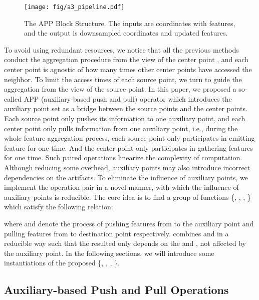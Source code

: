 \documentclass[journal]{IEEEtran}
\begin{document}
\begin{figure*}[tbp]
\begin{center}
\texttt{[image: fig/a3\_pipeline.pdf]}
\end{center}
   \caption{The APP Block Structure. The inputs are coordinates with features, and the output is downsampled coordinates and updated features.}
\end{figure*}


To avoid using redundant resources, we notice that all the previous methods conduct the aggregation procedure from the view of the center point , and each center point is agnostic of how many times other center points have accessed the neighbor. To limit the access times of each source point, we turn to guide the aggregation from the view of the source point. In this paper, we proposed a so-called APP (\textcolor[rgb]{1,0,0}{a}uxiliary-based \textcolor[rgb]{1,0,0}{p}ush and \textcolor[rgb]{1,0,0}{p}ull) operator which introduces the auxiliary point set  as a bridge between the source points and the center points. Each source point  only pushes its information to one auxiliary point, and each center point  only pulls information from one auxiliary point, i.e., during the whole feature aggregation process, each source point only participates in emitting feature for one time. And the center point only participates in gathering features for one time. Such paired operations linearize the complexity of computation. Although reducing some overhead, auxiliary points may also introduce incorrect dependencies on the artifacts. To eliminate the influence of auxiliary points, we implement the operation pair in a novel manner, with which the influence of auxiliary points is reducible. The core idea is to find a group of functions \{, , , \} which satisfy the following relation:

\noindent
where  and  denote the process of pushing features from  to the auxiliary point  and pulling features from  to destination point  respectively.   combines  and  in a reducible way such that the resulted  only depends on the  and , not affected by the auxiliary point. In the following sections, we will introduce some instantiations of the proposed \{, , , \}.

\subsection{Auxiliary-based Push and Pull Operations}
\end{document}
